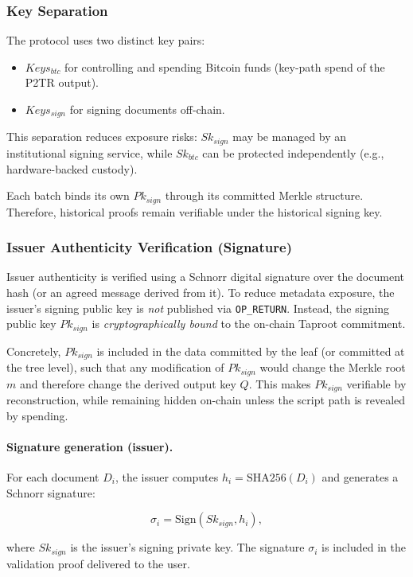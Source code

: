 \subsubsection{Key Separation}

The protocol uses two distinct key pairs:
\begin{itemize}
    \item $Keys_{btc}$ for controlling and spending Bitcoin funds (key-path spend of the P2TR output).
    \item $Keys_{sign}$ for signing documents off-chain.
\end{itemize}

This separation reduces exposure risks: $Sk_{sign}$ may be managed by an institutional signing service, while $Sk_{btc}$ can be protected independently (e.g., hardware-backed custody).

Each batch binds its own $Pk_{sign}$ through its committed Merkle structure.
Therefore, historical proofs remain verifiable under the historical signing key.

\subsubsection{Issuer Authenticity Verification (Signature)}

Issuer authenticity is verified using a Schnorr digital signature over the document hash (or an agreed message derived from it).
To reduce metadata exposure, the issuer’s signing public key is \emph{not} published via \texttt{OP\_RETURN}.
Instead, the signing public key $Pk_{sign}$ is \emph{cryptographically bound} to the on-chain Taproot commitment.

Concretely, $Pk_{sign}$ is included in the data committed by the leaf (or committed at the tree level), such that any modification of $Pk_{sign}$ would change the Merkle root $m$ and therefore change the derived output key $Q$.
This makes $Pk_{sign}$ verifiable by reconstruction, while remaining hidden on-chain unless the script path is revealed by spending.

\paragraph{Signature generation (issuer).}
For each document $D_i$, the issuer computes $h_i=\mathrm{SHA256}(D_i)$ and generates a Schnorr signature:

\[
\sigma_i = \mathrm{Sign}(Sk_{sign}, h_i),
\]

where $Sk_{sign}$ is the issuer’s signing private key.
The signature $\sigma_i$ is included in the validation proof delivered to the user.


